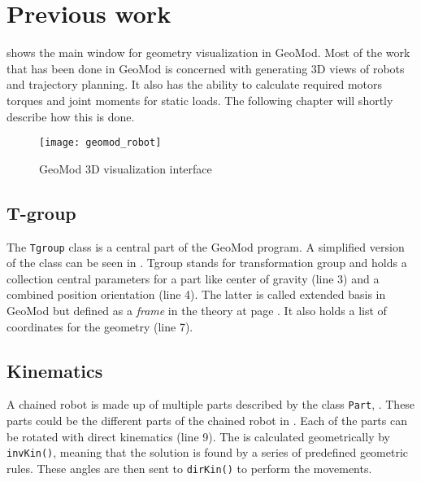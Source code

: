 \chapter{Previous work}\label{previous_work}

 shows the main window for geometry visualization in GeoMod. Most of the work that has been done in GeoMod is concerned with generating 3D views of robots and trajectory planning.  It also has the ability to calculate required motors torques and joint moments for static loads. The following chapter will shortly describe how this is done. 

\begin{figure}
 \centering 
 \texttt{[image: geomod\_robot]}
 \caption{GeoMod 3D visualization interface}
 \label{geomod_interface}
\end{figure}

\section{T-group}


The \texttt{Tgroup} class is a central part of the GeoMod program. A simplified version of the class can be seen in . Tgroup stands for transformation group and holds a collection central parameters for a part like center of gravity (line 3) and a combined position orientation (line 4). The latter is called extended basis in GeoMod but defined as a \textit{frame} in the theory at page \pageref{secTheory}. It also holds a list of coordinates for the geometry (line 7).

\label{Tgroup}


\section{Kinematics}


A chained robot is made up of multiple parts described by the class \texttt{Part}, . These parts could be the different parts of the chained robot in . Each of the parts can be rotated with direct kinematics (line 9). The  is calculated geometrically by \texttt{invKin()}, meaning that the solution is found by a series of predefined geometric rules. These angles are then sent to \texttt{dirKin()} to perform the  movements.


